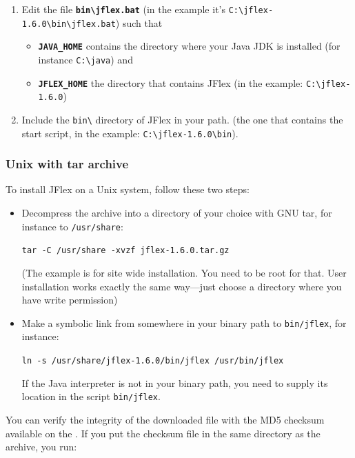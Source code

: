 \documentclass[11pt]{scrartcl}
\newcommand{\bs}{\textbackslash}
\newcommand{\longver}{1.6.0}
\begin{document}
\begin{enumerate}
\item
Edit the file \textbf{\texttt{bin\bs jflex.bat}}
(in the example it's \texttt{C:\bs jflex-\longver\bs bin\bs jflex.bat})
such that

\begin{itemize}
\item
  \textbf{\texttt{JAVA\_HOME}} contains the directory where your Java JDK is installed
  (for instance \verb+C:\java+) and
\item
  \textbf{\texttt{JFLEX\_HOME}} the directory that contains JFlex (in the example:
  \texttt{C:\bs jflex-\longver})
\end{itemize}
 
\item
Include the \verb+bin\+ directory of JFlex in your path.
(the one that contains the start script, in the example: \texttt{C:\bs jflex-\longver\bs bin}).
\end{enumerate}

\subsubsection{Unix with tar archive}

To install JFlex on a Unix system, follow these two steps:
\begin{itemize}
\item
  Decompress the archive into a directory of your choice
  with GNU tar, for instance to \texttt{/usr/share}:

  \texttt{tar -C /usr/share -xvzf jflex-\longver.tar.gz}
  
  (The example is for site wide installation. You need to
  be root for that. User installation works exactly the
  same way---just choose a directory where you have write
  permission)

\item
  Make a symbolic link from somewhere in your binary 
  path to \texttt{bin/jflex}, for instance:

  \texttt{ln -s /usr/share/jflex-\longver/bin/jflex /usr/bin/jflex}

  If the Java interpreter is not in your binary path, you
  need to supply its location in the script \texttt{bin/jflex}.
\end{itemize}

You can verify the integrity of the downloaded file with
the MD5 checksum available on the . 
If you put the checksum file in the same directory
as the archive, you run:
\end{document}
